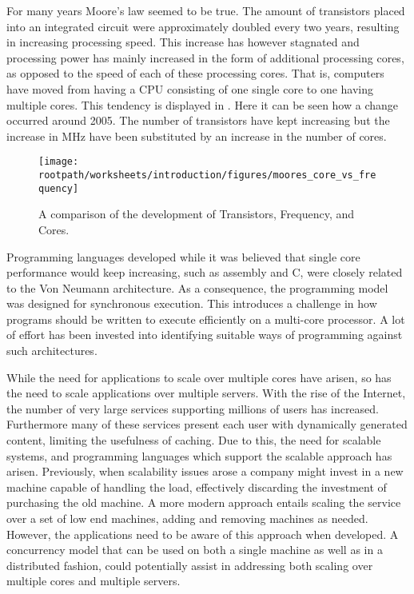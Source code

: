 \makeatletter {}\makeatother
{}
For many years Moore's law\cite{moore1965cramming} seemed to be true. The amount of transistors placed into an integrated circuit were approximately doubled every two years, resulting in increasing processing speed. This increase has however stagnated and processing power has mainly increased in the form of additional processing cores, as opposed to the speed of each of these processing cores\cite[p. 22]{sevenModels}. That is, computers have moved from having a \ac{CPU} consisting of one single core to one having multiple cores. This tendency is displayed in . Here it can be seen how a change occurred around 2005. The number of transistors have kept increasing but the increase in MHz have been substituted by an increase in the number of cores.
\label{chap:introduction}

\begin{figure}[htbp]
\centering
 \texttt{[image: \\rootpath/worksheets/introduction/figures/moores\_core\_vs\_frequency]} 
 \caption{A comparison of the development of Transistors, Frequency, and Cores\cite{isca2009}.}
\label{fig:moores_in_reality}
\end{figure}

Programming languages developed while it was believed that single core performance would keep increasing, such as assembly and C, were closely related to the Von Neumann architecture. As a consequence, the programming model was designed for synchronous execution. This introduces a challenge in how programs should be written to execute efficiently on a multi-core processor. A lot of effort has been invested into identifying suitable ways of programming against such architectures\cite{shavit1997software}\cite{haller2007actors}\cite{hewitt2014actor}\cite{scherer2005advanced}.

While the need for applications to scale over multiple cores have arisen, so has the need to scale applications over multiple servers. With the rise of the Internet, the number of very large services supporting millions of users has increased. Furthermore many of these services present each user with dynamically generated content, limiting the usefulness of caching. Due to this, the need for scalable systems, and programming languages which support the scalable approach has arisen. Previously, when scalability issues arose a company might invest in a new machine capable of handling the load, effectively discarding the investment of purchasing the old machine\cite[p. 2]{haller2007actors}. A more modern approach entails scaling the service over a set of low end machines, adding and removing machines as needed. However, the applications need to be aware of this approach when developed. A concurrency model that can be used on both a single machine as well as in a distributed fashion, could potentially assist in addressing both scaling over multiple cores and multiple servers.

